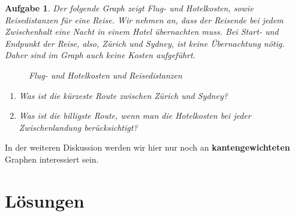 \documentclass[12pt,a4paper]{report}
\theoremstyle{break}
\newtheorem{exercise}{Aufgabe}[chapter]
\theoremstyle{plain}
\begin{document}
\begin{exercise}\label{extravel}
Der folgende Graph zeigt Flug- und Hotelkosten, sowie Reisedistanzen
f\"{u}r eine Reise. Wir nehmen an, dass der Reisende bei jedem Zwischenhalt eine Nacht in einem Hotel \"{u}bernachten muss.
Bei Start- und Endpunkt der Reise, also, Z\"urich und Sydney, ist keine \"{U}bernachtung n\"{o}tig. Daher sind im Graph auch 
keine Kosten aufgef\"{u}hrt.
\begin{figure}[H]
\centerline{
}
\caption{Flug- und Hotelkosten und Reisedistanzen}
\end{figure}
\begin{enumerate}
\item Was ist die \emph{k\"{u}rzeste} Route zwischen Z\"{u}rich und
    Sydney?
\item Was ist die \emph{billigste} Route, wenn man die Hotelkosten bei jeder Zwischenlandung ber\"ucksichtigt?
\end{enumerate}
\end{exercise}

In der weiteren Diskussion werden wir hier nur noch an
\textbf{kantengewichteten} Graphen interessiert sein. 

\newpage
\section{L\"{o}sungen}
\end{document}
